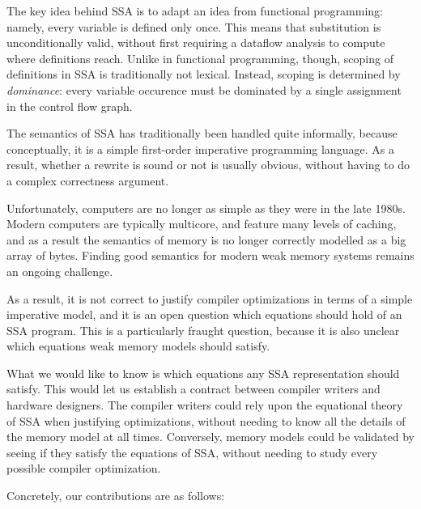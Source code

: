 \documentclass[acmsmall,screen,review]{acmart}
\begin{document}
The key idea behind SSA is to adapt an idea from functional programming: namely, every variable is
defined only once. This means that substitution is unconditionally valid, without first requiring a
dataflow analysis to compute where definitions reach. Unlike in functional programming, though,
scoping of definitions in SSA is traditionally not lexical. Instead, scoping is determined by
\emph{dominance}: every variable occurence must be dominated by a single assignment in the control
flow graph.

The semantics of SSA has traditionally been handled quite informally, because conceptually, it is a
simple first-order imperative programming language. As a result, whether a rewrite is sound or not
is usually obvious, without having to do a complex correctness argument.

Unfortunately, computers are no longer as simple as they were in the late 1980s. Modern computers
are typically multicore, and feature many levels of caching, and as a result the semantics of memory
is no longer correctly modelled as a big array of bytes. Finding good semantics for modern weak
memory systems remains an ongoing challenge.

As a result, it is not correct to justify compiler optimizations in terms of a simple imperative
model, and it is an open question which equations should hold of an SSA program. This is a
particularly fraught question, because it is also unclear which equations weak memory models should
satisfy.

What we would like to know is which equations any SSA representation should satisfy. This would let
us establish a contract between compiler writers and hardware designers. The compiler writers could
rely upon the equational theory of SSA when justifying optimizations, without needing to know all
the details of the memory model at all times.  Conversely, memory models could be validated by
seeing if they satisfy the equations of SSA, without needing to study every possible compiler
optimization.

Concretely, our contributions are as follows: 
\end{document}
